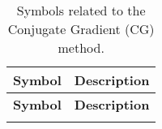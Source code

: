 \begin{longtable}{c p{10cm}}
    \caption{Symbols related to the Conjugate Gradient (CG) method.}\label{tab:cg_symbols}                                               \\
    \hline
    \textbf{Symbol}        & \textbf{Description}                                                                                        \\
    \hline
    \endfirsthead

    \hline
    \textbf{Symbol}        & \textbf{Description}                                                                                        \\
    \hline
    \endhead

    \hline
    \endfoot

    \hline
    \endlastfoot


\end{longtable}
